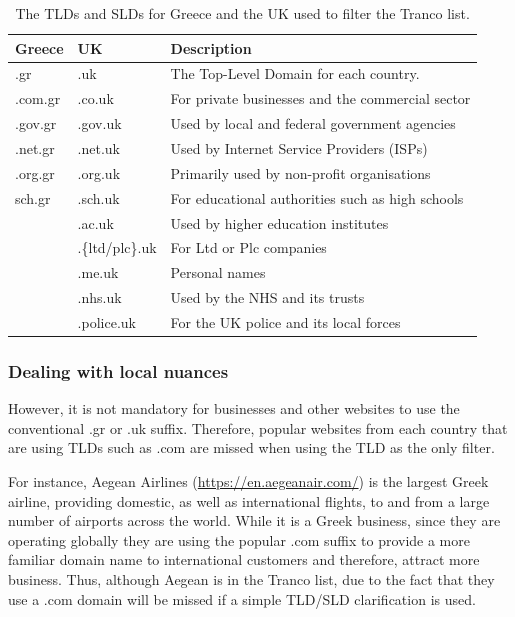 \documentclass[../main.tex]{subfiles}
\begin{document}
\begin{table}[ht]
\centering
\begin{tabular}{@{}lll@{}}
\toprule
\textbf{Greece} & \textbf{UK}     & \textbf{Description}                                     \\ \midrule
.gr             & .uk             & The Top-Level Domain for each country.                   \\
.com.gr         & .co.uk          & For private businesses and the commercial sector         \\
.gov.gr         & .gov.uk         & Used by local and federal government agencies            \\
.net.gr         & .net.uk         & Used by Internet Service Providers (ISPs)                \\
.org.gr         & .org.uk         & Primarily used by non-profit organisations               \\
sch.gr          & .sch.uk         & For educational authorities such as high schools         \\
                & .ac.uk          & Used by higher education institutes                      \\
                & .\{ltd/plc\}.uk & For Ltd or Plc companies                                 \\
                & .me.uk          & Personal names                                           \\
                & .nhs.uk         & Used by the NHS and its trusts                           \\
                & .police.uk      & For the UK police and its local forces                   \\ \bottomrule
\end{tabular}
\caption{The TLDs and SLDs for Greece \cite{gr_registar} and the UK \cite{nominet_additional_domains, nominet_rules} used to filter the Tranco list.}
\label{tab:impl_tlds}
\end{table}

\subsubsection{Dealing with local nuances}
However, it is not mandatory for businesses and other websites to use the conventional .gr or .uk suffix. Therefore, popular websites from each country that are using TLDs such as .com are missed when using the TLD as the only filter. 

For instance, Aegean Airlines (\url{https://en.aegeanair.com/}) is the largest Greek airline, providing domestic, as well as international flights, to and from a large number of airports across the world. While it is a Greek business, since they are operating globally they are using the popular .com suffix to provide a more familiar domain name to international customers and therefore, attract more business. Thus, although Aegean is in the Tranco list, due to the fact that they use a .com domain will be missed if a simple TLD/SLD clarification is used.
\end{document}
